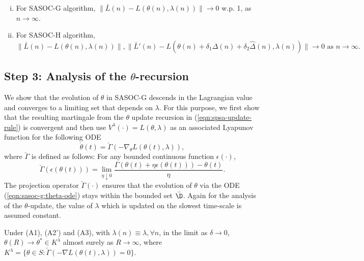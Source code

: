 \documentclass[11pt,letterpaper,english]{article}
\begin{document}
\begin{lemma}
\label{lemma:Lagrangian}
\begin{enumerate}[(i)]
    \item For SASOC-G algorithm, $\|\bar{L}(n) - L(\theta(n), \lambda(n)) \|
\rightarrow 0$ w.p. 1, as $n \rightarrow \infty$.
    \item For SASOC-H algorithm, 
$
\|\bar{L}(n) - L(\theta(n), \lambda(n)) \|, \|\bar{L}'(n) -
L(\theta(n) + \delta_1 \Delta(n) + \delta_2 \widehat\Delta(n), \lambda(n)) \|
\rightarrow 0 \textrm{ as } n \rightarrow \infty.
$
\end{enumerate}
\end{lemma}

\subsection*{Step 3: Analysis of the $\theta$-recursion}
We show that the evolution of $\theta$ in SASOC-G descends in the
Lagrangian value and converges to a limiting set that depends on $\lambda$. For
this purpose, we first show that the resulting martingale from the $\theta$
update recursion in (\ref{eqn:spsa-update-rule}) is convergent and then use
$V^{\lambda}(\cdot) = L (\theta,\lambda)$ as an associated Lyapunov function for
the following ODE 
\begin{equation}
\label{eqn:sasoc-g:theta-ode}
\dot{\theta}(t) = \check{\Gamma}\left ( -\nabla_\theta L(\theta(t), \lambda)
\right
),
\end{equation}
where $\check{\Gamma}$ is defined as follows: For any bounded continuous
function
$\epsilon(\cdot)$,
\begin{equation}
\label{eqn:Pi-bar-operator}
\check{\Gamma}(\epsilon(\theta(t))) = \lim\limits_{\eta \downarrow 0}
\dfrac{\Gamma(\theta(t) + \eta \epsilon(\theta(t))) - \theta(t)}{\eta}.
\end{equation}
The projection operator $\check{\Gamma}(\cdot)$ ensures that the evolution of
$\theta$ via the ODE (\ref{eqn:sasoc-g:theta-ode})
stays within the bounded set $\bar\D$. Again for the analysis of the
$\theta$-update, the value of $\lambda$ which is updated on the slowest
time-scale is assumed constant.

\begin{theorem}
Under (A1), (A2') and (A3), with $\lambda(n)\equiv\lambda,\forall n$, in the limit as $\delta \rightarrow 0$,
$\theta(R) \rightarrow \theta^* \in K^{\lambda}$ almost surely as $R \rightarrow
\infty$, where $K^{\lambda} = \{
\theta \in S: \check{\Gamma}\left ( -\nabla L(\theta(t), \lambda) \right ) = 0
\}$.
\end{theorem}
\end{document}
